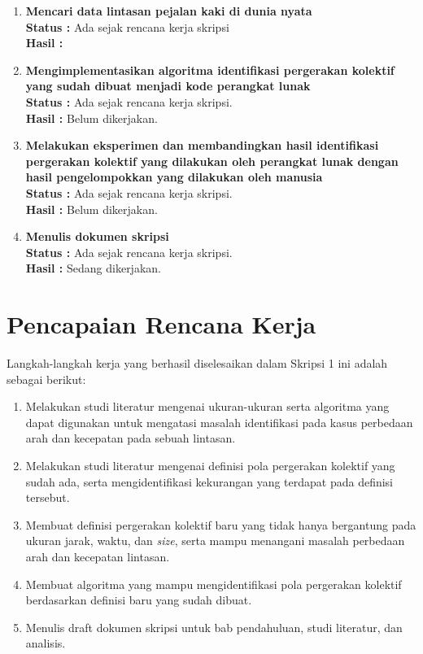 \documentclass[a4paper,twoside]{article}
\begin{document}
\begin{enumerate}
		\item \textbf{Mencari data lintasan pejalan kaki di dunia nyata}\\
		{\bf Status :} Ada sejak rencana kerja skripsi \\
		{\bf Hasil :} 

		\item \textbf{Mengimplementasikan algoritma identifikasi pergerakan kolektif yang sudah dibuat menjadi kode perangkat lunak} \\
		{\bf Status :} Ada sejak rencana kerja skripsi.\\
		{\bf Hasil :} Belum dikerjakan. \\

		\item \textbf{Melakukan eksperimen dan membandingkan hasil identifikasi pergerakan kolektif yang dilakukan oleh perangkat lunak dengan hasil pengelompokkan yang dilakukan oleh manusia}\\
		{\bf Status :} Ada sejak rencana kerja skripsi.\\
		{\bf Hasil :} Belum dikerjakan. \\

		\item \textbf{Menulis dokumen skripsi}\\
		{\bf Status :} Ada sejak rencana kerja skripsi.\\
		{\bf Hasil :} Sedang dikerjakan.
	\end{enumerate}

\section{Pencapaian Rencana Kerja}
Langkah-langkah kerja yang berhasil diselesaikan dalam Skripsi 1 ini adalah sebagai berikut:
\begin{enumerate}
\item Melakukan studi literatur mengenai ukuran-ukuran serta algoritma yang dapat digunakan untuk mengatasi masalah identifikasi pada kasus perbedaan arah dan kecepatan pada sebuah lintasan.
\item Melakukan studi literatur mengenai definisi pola pergerakan kolektif yang sudah ada, serta mengidentifikasi kekurangan yang terdapat pada definisi tersebut.
\item Membuat definisi pergerakan kolektif baru yang tidak hanya bergantung pada ukuran jarak, waktu, dan \textit{size}, serta mampu menangani masalah perbedaan arah dan kecepatan lintasan.
\item Membuat algoritma yang mampu mengidentifikasi pola pergerakan kolektif berdasarkan definisi baru yang sudah dibuat.
\item Menulis draft dokumen skripsi untuk bab pendahuluan, studi literatur, dan analisis.
\end{enumerate}
\end{document}
